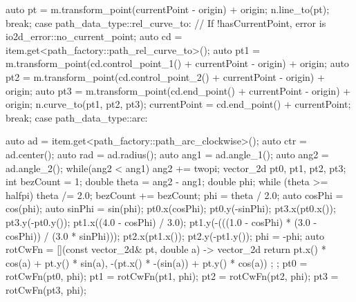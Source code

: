 \begin{codeblock}
{{{    auto pt = m.transform_point(currentPoint - origin) + origin;
    n.line_to(pt);
  } break;
  case path_data_type::rel_curve_to:
  {
    // If !hasCurrentPoint, error is io2d_error::no_current_point;
    auto cd = item.get<path_factory::path_rel_curve_to>();
    auto pt1 = m.transform_point(cd.control_point_1() + currentPoint -
      origin) + origin;
    auto pt2 = m.transform_point(cd.control_point_2() + currentPoint -
      origin) + origin;
    auto pt3 = m.transform_point(cd.end_point() + currentPoint - origin) +
      origin;
    n.curve_to(pt1, pt2, pt3);
    currentPoint = cd.end_point() + currentPoint;
  } break;
  case path_data_type::arc:
  {
    auto ad = item.get<path_factory::path_arc_clockwise>();
    auto ctr = ad.center();
    auto rad = ad.radius();
    auto ang1 = ad.angle_1();
    auto ang2 = ad.angle_2();
    while(ang2 < ang1) {
      ang2 += twopi;
    }
    vector_2d pt0, pt1, pt2, pt3;
    int bezCount = 1;
    double theta = ang2 - ang1;
    double phi;
    while (theta >= halfpi) {
      theta /= 2.0;
      bezCount += bezCount;
    }
    phi = theta / 2.0;
    auto cosPhi = cos(phi);
    auto sinPhi = sin(phi);
    pt0.x(cosPhi);
    pt0.y(-sinPhi);
    pt3.x(pt0.x());
    pt3.y(-pt0.y());
    pt1.x((4.0 - cosPhi) / 3.0);
    pt1.y(-(((1.0 - cosPhi) * (3.0 - cosPhi)) / (3.0 * sinPhi)));
    pt2.x(pt1.x());
    pt2.y(-pt1.y());
    phi = -phi;
    auto rotCwFn = [](const vector_2d& pt, double a) -> vector_2d {
      return { pt.x() * cos(a) + pt.y() * sin(a),
        -(pt.x() * -(sin(a)) + pt.y() * cos(a)) };
    };
    pt0 = rotCwFn(pt0, phi);
    pt1 = rotCwFn(pt1, phi);
    pt2 = rotCwFn(pt2, phi);
    pt3 = rotCwFn(pt3, phi);
    
}}}
\end{codeblock}
